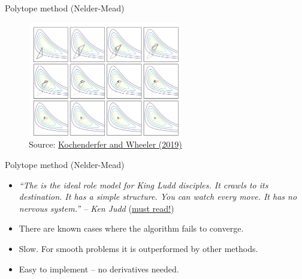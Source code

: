 \documentclass[11pt,xcolor={dvipsnames},aspectratio=159,hyperref={pdftex,pdfpagemode=UseNone,hidelinks,pdfdisplaydoctitle=true},usepdftitle=false]{beamer}
\begin{document}
    \begin{frame}{Polytope method (Nelder-Mead)}
        \centering
        \begin{figure}

        \includegraphics[width=0.6\textwidth]{nelder_mead2.png}
        \caption{Source: \href{https://mitpress.mit.edu/9780262039420/}{Kochenderfer and Wheeler (2019)}}
        \end{figure}
    \end{frame}

    \begin{frame}{Polytope method (Nelder-Mead)}
        \begin{itemize}
        \item \emph{``The  is the ideal role model for King Ludd disciples. It crawls to its destination. It has a simple structure. You can watch every move. It has no nervous system.'' -- Ken Judd} (\href{https://kenjudd.org/economics-and-computation/ludd-lives/}{must read!})

        \item There are known cases where the algorithm fails to converge. 
        \item Slow. For smooth problems it is outperformed by other methods.
        \item Easy to implement -- no derivatives needed.
        \end{itemize}
    \end{frame}
\end{document}
